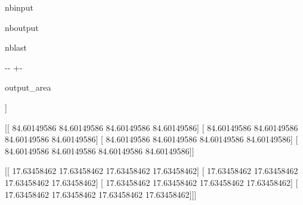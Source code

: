 \documentclass[letterpaper,10pt,english]{sphinxmanual}
\begin{document}
\begin{sphinxuseclass}{nbinput}
{
\begin{sphinxVerbatim}[commandchars=\\\{\}]
\llap{\color{nbsphinxin}[22]:\,\hspace{\fboxrule}\hspace{\fboxsep}}
\end{sphinxVerbatim}
}

\end{sphinxuseclass}
\begin{sphinxuseclass}{nboutput}
\begin{sphinxuseclass}{nblast}
{

\kern-\sphinxverbatimsmallskipamount\kern-\baselineskip
\kern+\FrameHeightAdjust\kern-\fboxrule
\vspace{\nbsphinxcodecellspacing}

\begin{sphinxuseclass}{output_area}
\begin{sphinxuseclass}{}


\begin{sphinxVerbatim}[commandchars=\\\{\}]
[[[500.         500.         500.         500.        ]
  [500.         500.         500.         500.        ]
  [500.         500.         500.         500.        ]
  [500.         500.         500.         500.        ]]

 [[ 84.60149586  84.60149586  84.60149586  84.60149586]
  [ 84.60149586  84.60149586  84.60149586  84.60149586]
  [ 84.60149586  84.60149586  84.60149586  84.60149586]
  [ 84.60149586  84.60149586  84.60149586  84.60149586]]

 [[ 17.63458462  17.63458462  17.63458462  17.63458462]
  [ 17.63458462  17.63458462  17.63458462  17.63458462]
  [ 17.63458462  17.63458462  17.63458462  17.63458462]
  [ 17.63458462  17.63458462  17.63458462  17.63458462]]]
\end{sphinxVerbatim}



\end{sphinxuseclass}
\end{sphinxuseclass}
}

\end{sphinxuseclass}
\end{sphinxuseclass}
\end{document}
